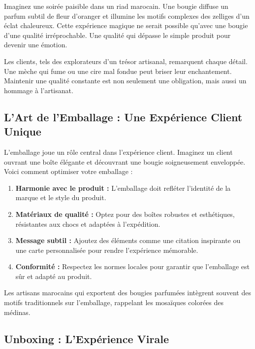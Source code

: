\documentclass[11pt,fleqn,onecolumn,oneside]{book}
\begin{document}
Imaginez une soirée paisible dans un riad marocain. Une bougie diffuse un parfum subtil de fleur d’oranger et illumine les motifs complexes des zelliges d’un éclat chaleureux. Cette expérience magique ne serait possible qu’avec une bougie d’une qualité irréprochable. Une qualité qui dépasse le simple produit pour devenir une émotion.

\begin{corollary}
Les clients, tels des explorateurs d’un trésor artisanal, remarquent chaque détail. Une mèche qui fume ou une cire mal fondue peut briser leur enchantement. Maintenir une qualité constante est non seulement une obligation, mais aussi un hommage à l’artisanat.
\end{corollary}

\subsection*{L’Art de l’Emballage : Une Expérience Client Unique}

L’emballage joue un rôle central dans l’expérience client. Imaginez un client ouvrant une boîte élégante et découvrant une bougie soigneusement enveloppée. Voici comment optimiser votre emballage :
\begin{enumerate}
    \item \textbf{Harmonie avec le produit :} L’emballage doit refléter l’identité de la marque et le style du produit.
    \item \textbf{Matériaux de qualité :} Optez pour des boîtes robustes et esthétiques, résistantes aux chocs et adaptées à l’expédition.
    \item \textbf{Message subtil :} Ajoutez des éléments comme une citation inspirante ou une carte personnalisée pour rendre l’expérience mémorable.
    \item \textbf{Conformité :} Respectez les normes locales pour garantir que l’emballage est sûr et adapté au produit.
\end{enumerate}

\begin{example}
Les artisans marocains qui exportent des bougies parfumées intègrent souvent des motifs traditionnels sur l’emballage, rappelant les mosaïques colorées des médinas.
\end{example}

\subsection*{Unboxing : L’Expérience Virale}
\end{document}
